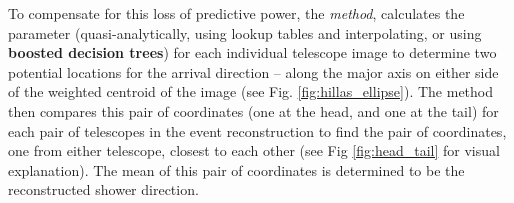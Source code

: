 \documentclass[main.tex]{subfiles}
\begin{document}
To compensate for this loss of predictive power, the \disp \textit{method}, calculates the \disp parameter (quasi-analytically, using lookup tables and interpolating, or using \textbf{boosted decision trees}) for each individual telescope image to determine two potential locations for the arrival direction -- along the major axis on either side of the weighted centroid of the image (see Fig. \ref{fig:hillas_ellipse}). The method then compares this pair of coordinates (one at the head, and one at the tail) for each pair of telescopes in the event reconstruction to find the pair of coordinates, one from either telescope, closest to each other (see Fig \ref{fig:head_tail} for visual explanation). The mean of this pair of coordinates is determined to be the reconstructed shower direction.
\begin{figure}[htbp]
  \centering
{}
\end{figure}
\end{document}

